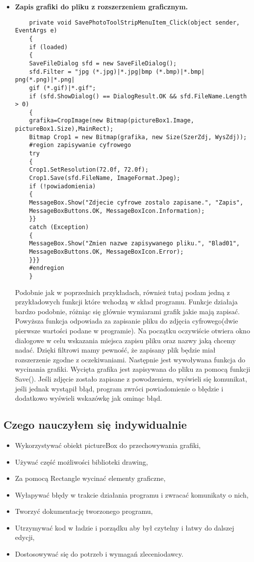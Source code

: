 \begin{itemize}
\item \textbf{Zapis grafiki do pliku z rozszerzeniem graficznym.}\\
\begin{lstlisting}
	private void SavePhotoToolStripMenuItem_Click(object sender, EventArgs e)
	{
	if (loaded)
	{
	SaveFileDialog sfd = new SaveFileDialog();
	sfd.Filter = "jpg (*.jpg)|*.jpg|bmp (*.bmp)|*.bmp| png(*.png)|*.png| 
	gif (*.gif)|*.gif";
	if (sfd.ShowDialog() == DialogResult.OK && sfd.FileName.Length > 0)
	{
	grafika=CropImage(new Bitmap(pictureBox1.Image, pictureBox1.Size),MainRect);
	Bitmap Crop1 = new Bitmap(grafika, new Size(SzerZdj, WysZdj));
	#region zapisywanie cyfrowego
	try
	{
	Crop1.SetResolution(72.0f, 72.0f);
	Crop1.Save(sfd.FileName, ImageFormat.Jpeg);
	if (!powiadomienia)
	{
	MessageBox.Show("Zdjecie cyfrowe zostalo zapisane.", "Zapis", 
	MessageBoxButtons.OK, MessageBoxIcon.Information);
	}}
	catch (Exception)
	{
	MessageBox.Show("Zmien nazwe zapisywanego pliku.", "Blad01", 
	MessageBoxButtons.OK, MessageBoxIcon.Error);
	}}}
	#endregion
	}     

\end{lstlisting}
Podobnie jak w poprzednich przykładach, również tutaj podam jedną z przykładowych funkcji które wchodzą w skład programu. Funkcje działaja bardzo podobnie, różniąc się głównie wymiarami grafik jakie mają zapisać.
Powyższa funkcja odpowiada za zapisanie pliku do zdjęcia cyfrowego(dwie pierwsze wartości podane w programie).
Na początku oczywiście otwiera okno dialogowe w celu wskazania miejsca zapisu pliku oraz nazwy jaką chcemy nadać. Dzięki filtrowi mamy pewność, że zapisany plik będzie miał rozszerzenie zgodne z oczekiwaniami.
Następnie jest wywoływana funkcja do wycinania grafiki. Wycięta grafika jest zapisywana do pliku za pomocą funkcji Save(). Jeśli zdjęcie zostało zapisane z powodzeniem, wyświeli się komunikat, jeśli jednak wystąpił błąd, program zwróci powiadomienie o błędzie i dodatkowo wyświeli wskazówkę jak ominąc błąd.
\end{itemize}
\subsection{Czego nauczyłem się indywidualnie}
\begin{itemize}
	\item Wykorzystywać obiekt pictureBox do przechowywania grafiki,
	\item Używać część możliwości biblioteki drawing,
	\item Za pomocą Rectangle wycinać elementy graficzne,
	\item Wyłapywać błędy w trakcie działania programu i zwracać komunikaty o nich,
	\item Tworzyć dokumentację tworzonego programu,
	\item Utrzymywać kod w ładzie i porządku aby był czytelny i łatwy do dalszej edycji,
	\item Dostosowywać się do potrzeb i wymagań zleceniodawcy.
\end{itemize}
